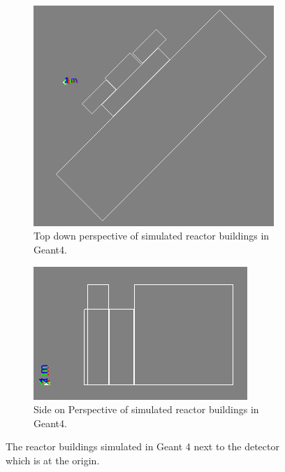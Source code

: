 \begin{figure}[H]
\centering
\begin{subfigure}{.5\textwidth}
  \centering
  \includegraphics[width=0.685\linewidth]{Chapter5/Figs/Raster/reactorBuildingsTopDown.png}
  \captionsetup{width=.9\linewidth}
  \caption{Top down perspective of simulated reactor buildings in Geant4.}
  \label{subFig:simulatedReactorBuildingsTopDown}
\end{subfigure}%
\begin{subfigure}{.5\textwidth}
  \centering
  \includegraphics[width=\linewidth]{Chapter5/Figs/Raster/reactorBulidingsDepth.png}
  \captionsetup{width=.9\linewidth}
  \caption{Side on Perspective of simulated reactor buildings in Geant4.}
  \label{subFig:simulatedReactorBuildingsDepth}
\end{subfigure}
\caption{The reactor buildings simulated in Geant 4 next to the detector which is at the origin.}
\label{fig:simulatedReactorBuildings}
\end{figure}


